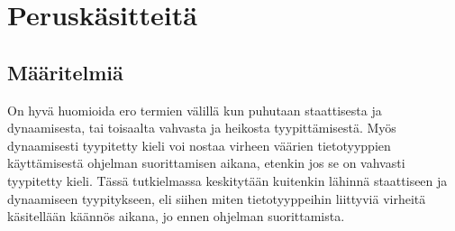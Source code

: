 \chapter{Peruskäsitteitä}
\section{Määritelmiä}

On hyvä huomioida ero termien välillä kun puhutaan staattisesta ja
dynaamisesta, tai toisaalta vahvasta ja heikosta tyypittämisestä. Myös
dynaamisesti tyypitetty kieli voi nostaa virheen väärien tietotyyppien
käyttämisestä ohjelman suorittamisen aikana, etenkin jos se on vahvasti
tyypitetty kieli. Tässä tutkielmassa keskitytään kuitenkin lähinnä
staattiseen ja dynaamiseen tyypitykseen, eli siihen miten tietotyyppeihin
liittyviä virheitä käsitellään käännös aikana, jo ennen ohjelman
suorittamista.